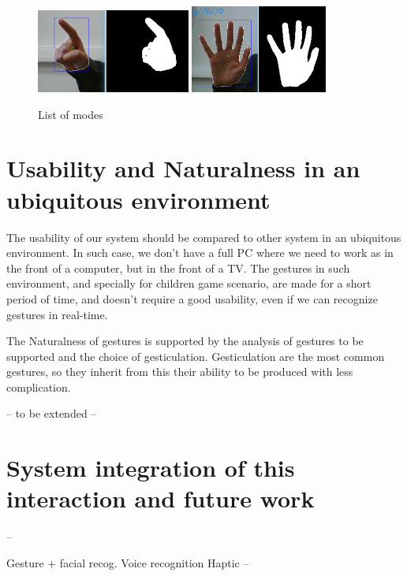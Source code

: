 \documentclass{llncs}
\newcommand\ignore[1]{}
\begin{document}
\begin{figure}[!htb]
\centering
  \includegraphics[width=0.45\textwidth]{./pics/point.png}
  \includegraphics[width=0.4\textwidth]{./pics/simplify.png}
  \caption{List of modes}
\end{figure}


\section{Usability and Naturalness in an ubiquitous environment}

The usability of our system should be compared to other system in an ubiquitous
environment. In such case, we don't have a full PC where we need to work as in
the front of a computer, but in the front of a TV.
The gestures in such environment, and specially for children game scenario,
are made for a short period of time, and doesn't require a good usability,
even if we can recognize gestures in real-time.

The Naturalness of gestures is supported by the analysis of gestures to be
supported and the choice of gesticulation.
Gesticulation are the most common gestures, so they inherit from this their
ability to be produced with less complication.

-- to be extended --

\section{System integration of this interaction and future work}
--

Gesture + facial recog.
Voice recognition
Haptic 
--

\ignore{
Naturalness came from the analysis of gestures used in talk shows.
(gestures used many times means nature gestures)
Reverse thinking.
Usability in the context of RevTV ??
}


\end{document}
